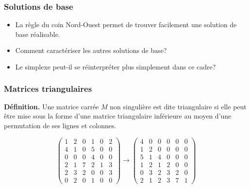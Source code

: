 \documentclass[usepdftitle=false]{beamer}
\begin{document}
\begin{frame}
\frametitle{Solutions de base}

\begin{itemize}
\item 
La règle du coin Nord-Ouest permet de trouver facilement une solution de base réalisable.
\item
Comment caractériser les autres solutions de base?
\item
Le simplexe peut-il se réinterpréter plus simplement dans ce cadre?
\end{itemize}

\end{frame}

\begin{frame}
\frametitle{Matrices triangulaires}

{\bf Définition.}
Une matrice carrée $M$ non singulière est dite triangulaire si elle
peut être mise sous la forme d'une matrice triangulaire inférieure au moyen d'une permutation de ses lignes et colonnes.

\mbox{}

$$
\begin{pmatrix}
1 & 2 & 0 & 1 & 0 & 2 \\
4 & 1 & 0 & 5 & 0 & 0 \\
0 & 0 & 0 & 4 & 0 & 0 \\
2 & 1 & 7 & 2 & 1 & 3 \\
2 & 3 & 2 & 0 & 0 & 3 \\
0 & 2 & 0 & 1 & 0 & 0
\end{pmatrix}
\rightarrow
\begin{pmatrix}
4 & 0 & 0 & 0 & 0 & 0 \\
1 & 2 & 0 & 0 & 0 & 0 \\
5 & 1 & 4 & 0 & 0 & 0 \\
1 & 2 & 1 & 2 & 0 & 0 \\
0 & 3 & 2 & 3 & 2 & 0 \\
2 & 1 & 2 & 3 & 7 & 1
\end{pmatrix}
$$

\end{frame}
\end{document}
